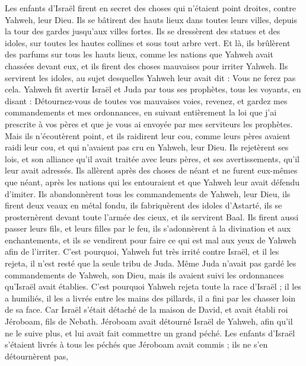 \begin{multicols}{2}
Les enfants d’Israël firent en secret des choses qui n’étaient point droites, contre Yahweh, leur Dieu. Ils se bâtirent des hauts lieux dans toutes leurs villes, depuis la tour des gardes jusqu’aux villes fortes.
Ils se dressèrent des statues et des idoles, sur toutes les hautes collines et sous tout arbre vert.
Et là, ils brûlèrent des parfums sur tous les hauts lieux, comme les nations que Yahweh avait chassées devant eux, et ils firent des choses mauvaises pour irriter Yahweh.
Ils servirent les idoles, au sujet desquelles Yahweh leur avait dit : Vous ne ferez pas cela.
Yahweh fit avertir Israël et Juda par tous ses prophètes, tous les voyants, en disant : Détournez-vous de toutes vos mauvaises voies, revenez, et gardez mes commandements et mes ordonnances, en suivant entièrement la loi que j’ai prescrite à vos pères et que je vous ai envoyée par mes serviteurs les prophètes.
Mais ils n’écoutèrent point, et ils raidirent leur cou, comme leurs pères avaient raidi leur cou, et qui n’avaient pas cru en Yahweh, leur Dieu.
Ils rejetèrent ses lois, et son alliance qu’il avait traitée avec leurs pères, et ses avertissements, qu’il leur avait adressés. Ils allèrent après des choses de néant et ne furent eux-mêmes que néant, après les nations qui les entouraient et que Yahweh leur avait défendu d’imiter.
Ils abandonnèrent tous les commandements de Yahweh, leur Dieu, ils firent deux veaux en métal fondu, ils fabriquèrent des idoles d’Astarté, ils se prosternèrent devant toute l’armée des cieux, et ils servirent Baal.
Ils firent aussi passer leurs fils, et leurs filles par le feu, ils s’adonnèrent à la divination et aux enchantements, et ils se vendirent pour faire ce qui est mal aux yeux de Yahweh afin de l’irriter.
C’est pourquoi, Yahweh fut très irrité contre Israël, et il les rejeta, il n’est resté que la seule tribu de Juda.
Même Juda n’avait pas gardé les commandements de Yahweh, son Dieu, mais ils avaient suivi les ordonnances qu’Israël avait établies.
C’est pourquoi Yahweh rejeta toute la race d’Israël ; il les a humiliés, il les a livrés entre les mains des pillards, il a fini par les chasser loin de sa face.
Car Israël s’était détaché de la maison de David, et avait établi roi Jéroboam, fils de Nebath. Jéroboam avait détourné Israël de Yahweh, afin qu’il ne le suive plus, et lui avait fait commettre un grand péché.
Les enfants d’Israël s’étaient livrés à tous les péchés que Jéroboam avait commis ; ils ne s’en détournèrent pas,

\end{multicols}

